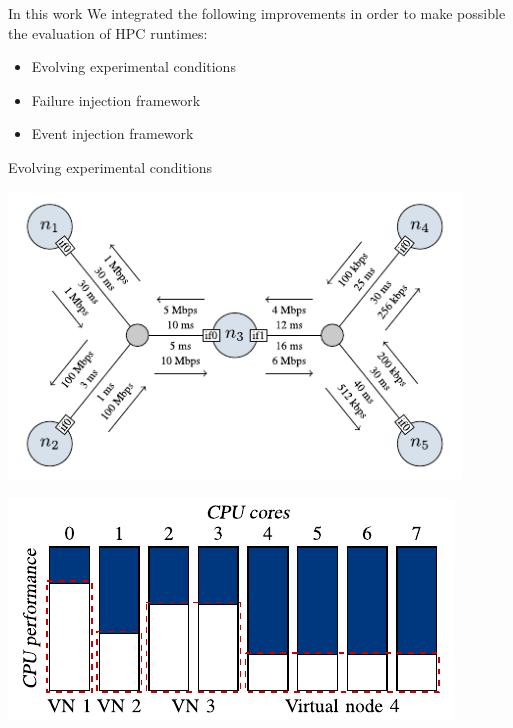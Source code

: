\documentclass[11pt,xcolor=dvipsnames,presentation]{beamer}
\begin{document}
\begin{frame}[label=sec-1-0-3]{In this work}
We integrated the following improvements in order to
make possible the evaluation of HPC runtimes:

\begin{itemize}
\item Evolving experimental conditions
\item Failure injection framework
\item Event injection framework
\end{itemize}
\end{frame}

\begin{frame}[label=sec-1-0-4]{Evolving experimental conditions}

\begin{minipage}{0.5\textwidth}
\begin{center}
    \includegraphics[width=0.9\textwidth]{figures/links}
\end{center}\end{minipage}\hfill
\begin{minipage}{0.5\textwidth}
\begin{center}
    \includegraphics[width=\textwidth]{figures/procs}
\end{center}\end{minipage}


\end{frame}
\end{document}
